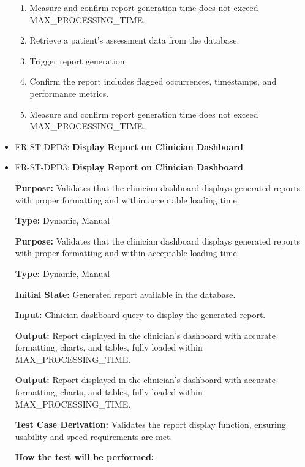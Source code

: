 \documentclass[12pt, titlepage]{article}
\begin{document}
\begin{itemize}
\begin{mdframed}[linewidth=0.5mm]
\begin{enumerate}[noitemsep]
        \item Measure and confirm report generation time does not exceed \\ MAX\_PROCESSING\_TIME.
        \item Retrieve a patient’s assessment data from the database.
        \item Trigger report generation.
        \item Confirm the report includes flagged occurrences, timestamps, and performance metrics.
        \item Measure and confirm report generation time does not exceed \\ MAX\_PROCESSING\_TIME.
      \end{enumerate}
  \end{mdframed}

  \item FR-ST-DPD3: \textbf{Display Report on Clinician Dashboard}
  \item FR-ST-DPD3: \textbf{Display Report on Clinician Dashboard}
  \begin{mdframed}[linewidth=0.5mm]
      \textbf{Purpose:} Validates that the clinician dashboard displays generated reports with proper formatting and within acceptable loading time. \par
      \textbf{Type:} Dynamic, Manual \par
      \textbf{Purpose:} Validates that the clinician dashboard displays generated reports with proper formatting and within acceptable loading time. \par
      \textbf{Type:} Dynamic, Manual \par
      \textbf{Initial State:} Generated report available in the database. \par
      \textbf{Input:} Clinician dashboard query to display the generated report. \par
      \textbf{Output:} Report displayed in the clinician’s dashboard with accurate formatting, charts, and tables, fully loaded within MAX\_PROCESSING\_TIME. \par
      \textbf{Output:} Report displayed in the clinician’s dashboard with accurate formatting, charts, and tables, fully loaded within MAX\_PROCESSING\_TIME. \par
      \textbf{Test Case Derivation:} Validates the report display function, ensuring usability and speed requirements are met. \par
      \textbf{How the test will be performed:}
      \begin{enumerate}[noitemsep]

\end{enumerate}
\end{mdframed}
\end{itemize}
\end{document}
